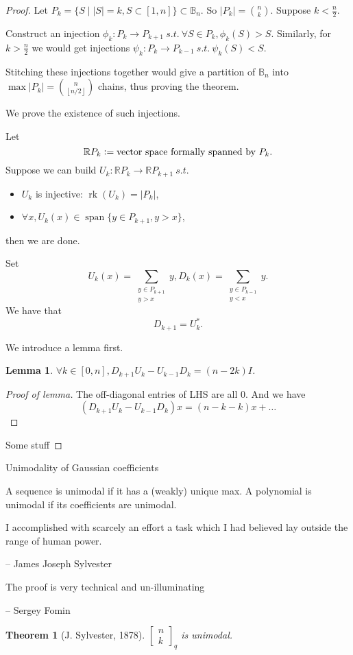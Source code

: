 \documentclass{report}
\newcommand{\R}{\mathbb{R}}
\newcommand{\st}{\ s.t.\ }
\def \rk {\operatorname{rk}}
\def \sp {\operatorname{span}}
\newcommand{\qbin}[2]{\begin{bmatrix}{#1}\\ {#2}\end{bmatrix}_q}
\newcommand{\defeq}{\vcentcolon=}
\newtheorem{theorem}{Theorem}[section]
\newtheorem{lemma}{Lemma}[section]
\theoremstyle{definition}
\theoremstyle{remark}
\numberwithin{equation}{section}
\begin{document}
\begin{proof}
    Let $P_k = \{S \mid |S| = k, S \subset [1, n]\} \subset \mathbb{B}_n$. So $|P_k| = \binom{n}{k}$. Suppose $k < \frac{n}{2}$.
    
    Construct an injection $\phi_k: P_k \to P_{k+1} \st \forall S \in P_k, \phi_k(S) > S$. Similarly, for $k > \frac{n}{2}$ we would get injections $\psi_k: P_k \to P_{k-1} \st \psi_k(S) < S$.

    Stitching these injections together would give a partition of $\mathbb{B}_n$ into $\max|P_k| = \binom{n}{\left\lfloor n/2 \right\rfloor}$ chains, thus proving the theorem.

    We prove the existence of such injections.

    Let \[\R P_k \defeq \text{vector space formally spanned by $P_k$}.\]
    Suppose we can build $U_k: \R P_k \to \R P_{k+1} \st$ \begin{itemize}
        \item $U_k$ is injective: $\rk(U_k) = |P_k|$,
        \item $\forall x, U_k(x) \in \sp \{y \in P_{k+1}, y > x\}$,
    \end{itemize}
    then we are done.

    Set \[U_k(x) = \sum_{\substack{y \in P_{k+1} \\ y > x}} y, D_k(x) = \sum_{\substack{y \in P_{k-1}\\ y < x}}y.\]
    We have that \[D_{k+1} = U^*_k.\]

    We introduce a lemma first.
    \begin{lemma}
        $\forall k \in [0, n], D_{k+1}U_k - U_{k-1}D_k = (n - 2k)I$.
    \end{lemma}
    \begin{proof}[Proof of lemma]\let\qed\relax
       The off-diagonal entries of LHS are all $0$. And we have 
       \[(D_{k+1}U_k - U_{k-1}D_k)x = (n - k - k)x + \ldots\]
    \end{proof}

    Some stuff
\end{proof}

Unimodality of Gaussian coefficients

A sequence is unimodal if it has a (weakly) unique max. A polynomial is unimodal if its coefficients are unimodal.

\epigraph{I accomplished with scarcely an effort a task which I had believed lay outside the range of human power.}{-- \textup{James Joseph Sylvester}}
\epigraph{The proof is very technical and un-illuminating}{-- \textup{Sergey Fomin}}
\begin{theorem}[J. Sylvester, 1878]
    $\qbin{n}{k}$ is unimodal.
\end{theorem}
\end{document}
